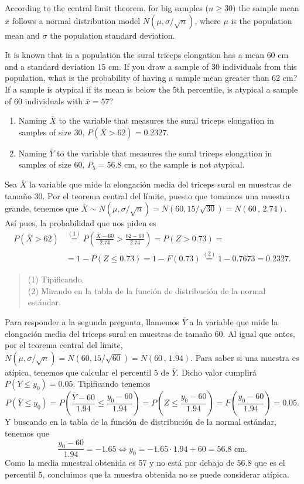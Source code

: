 {According to the central limit theorem, for big samples ($n\geq 30$) the sample mean $\bar x$ follows a normal
distribution model $N(\mu,\sigma/\sqrt{n})$, where $\mu$ is the population mean and $\sigma$ the population standard
deviation.

It is known that in a population the sural triceps elongation has a mean $60$ cm and a standard deviation $15$ cm.
If you draw a sample of 30 individuals from this population, what is the probability of having a sample mean greater
than 62 cm?
If a sample is atypical if its mean is below the 5th percentile, is atypical a sample of 60 individuals with $\bar
x=57$?
}
{
\begin{enumerate}
\item Naming $\bar X$ to the variable that measures the sural triceps elongation in samples of size 30, $P(\bar X>62)=0.2327$.
\item Naming $\bar Y$ to the variable that measures the sural triceps elongation in samples of size 60, $P_5=56.8$ cm, so the sample is not atypical.
\end{enumerate}
}
{Sea $\bar X$ la variable que mide la elongación media del triceps sural en muestras de tamaño 30. Por el teorema central del límite,
puesto que tomamos una muestra grande, tenemos que $\bar X\sim N(\mu,\sigma/\sqrt{n})=N(60,15/\sqrt{30})=N(60\,,\,2.74)$. Así pues, la
probabilidad que nos piden es
\begin{align*}
P(\bar X>62)& \stackrel{(1)}{=} P\left(\frac{\bar X-60}{2.74}>\frac{62-60}{2.74}\right)= P(Z>0.73) =\\
&= 1 - P(Z\leq 0.73)=1-F(0.73)\stackrel{(2)}{=}1-0.7673=0.2327.
\end{align*}
\begin{quote}
    \footnotesize
    (1) Tipificando.\\
    (2) Mirando en la tabla de la función de distribución de la normal estándar.
\end{quote}

Para responder a la segunda pregunta, llamemos $\bar Y$ a la variable que mide la elongación media del triceps sural en muestras de tamaño
60. Al igual que antes, por el teorema central del límite, $N(\mu,\sigma/\sqrt{n})=N(60,15/\sqrt{60})=N(60\,,\,1.94)$. Para saber si una
muestra es atípica, tenemos que calcular el percentil 5 de $\bar Y$.
Dicho valor cumplirá $P(\bar Y\leq y_0)=0.05$. Tipificando tenemos
\[
P(\bar Y\leq y_0)=
P\left(\frac{\bar Y-60}{1.94}\leq\frac{y_0-60}{1.94}\right)=
P\left(Z\leq\frac{y_0-60}{1.94}\right)=F\left(\frac{y_0-60}{1.94}\right)=0.05.
\]
Y buscando en la tabla de la función de distribución de la normal estándar, tenemos que
\[
\frac{y_0-60}{1.94}=-1.65 \Leftrightarrow y_0=-1.65\cdot 1.94+60= 56.8 \text{ cm}.
\]
Como la media muestral obtenida es 57 y no está por debajo de $56.8$ que es el percentil 5, concluimos que la muestra obtenida no se puede
considerar atípica.
}


